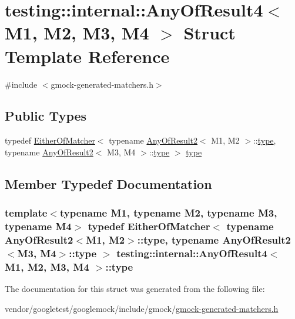 \hypertarget{structtesting_1_1internal_1_1AnyOfResult4}{}\section{testing\+:\+:internal\+:\+:Any\+Of\+Result4$<$ M1, M2, M3, M4 $>$ Struct Template Reference}
\label{structtesting_1_1internal_1_1AnyOfResult4}


{\ttfamily \#include $<$gmock-\/generated-\/matchers.\+h$>$}

\subsection*{Public Types}
\begin{DoxyCompactItemize}
\item 
typedef \hyperlink{classtesting_1_1internal_1_1EitherOfMatcher}{Either\+Of\+Matcher}$<$ typename \hyperlink{structtesting_1_1internal_1_1AnyOfResult2}{Any\+Of\+Result2}$<$ M1, M2 $>$\+::\hyperlink{structtesting_1_1internal_1_1AnyOfResult4_a4f3c9aebb4f7fc24287b59a0bdf1a4a6}{type}, typename \hyperlink{structtesting_1_1internal_1_1AnyOfResult2}{Any\+Of\+Result2}$<$ M3, M4 $>$\+::\hyperlink{structtesting_1_1internal_1_1AnyOfResult4_a4f3c9aebb4f7fc24287b59a0bdf1a4a6}{type} $>$ \hyperlink{structtesting_1_1internal_1_1AnyOfResult4_a4f3c9aebb4f7fc24287b59a0bdf1a4a6}{type}
\end{DoxyCompactItemize}


\subsection{Member Typedef Documentation}
\subsubsection[{\texorpdfstring{type}{type}}]{\setlength{\rightskip}{0pt plus 5cm}template$<$typename M1, typename M2, typename M3, typename M4$>$ typedef {\bf Either\+Of\+Matcher}$<$ typename {\bf Any\+Of\+Result2}$<$M1, M2$>$\+::{\bf type}, typename {\bf Any\+Of\+Result2}$<$M3, M4$>$\+::{\bf type} $>$ {\bf testing\+::internal\+::\+Any\+Of\+Result4}$<$ M1, M2, M3, M4 $>$\+::{\bf type}}\hypertarget{structtesting_1_1internal_1_1AnyOfResult4_a4f3c9aebb4f7fc24287b59a0bdf1a4a6}{}\label{structtesting_1_1internal_1_1AnyOfResult4_a4f3c9aebb4f7fc24287b59a0bdf1a4a6}


The documentation for this struct was generated from the following file\+:\begin{DoxyCompactItemize}
\item 
vendor/googletest/googlemock/include/gmock/\hyperlink{gmock-generated-matchers_8h}{gmock-\/generated-\/matchers.\+h}\end{DoxyCompactItemize}
